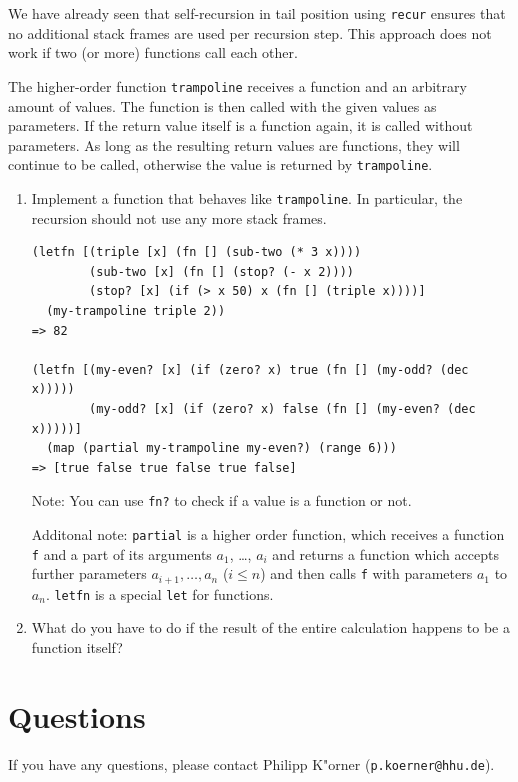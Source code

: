 \documentclass[11pt,a4paper]{article}
\begin{document}
\begin{exercise}
We have already seen that self-recursion in tail position
using \verb|recur| ensures that no additional stack frames are used per recursion step.
This approach does not work if two (or more) functions call each other.

The higher-order function \verb|trampoline| receives a function
and an arbitrary amount of values.
The function is then called with the given values as parameters.
If the return value itself is a function again, it is called without parameters.
As long as the resulting return values are functions, they will continue to be called,
otherwise the value is returned by \verb|trampoline|.

\begin{enumerate}[label=\alph*)]
    \item
    	Implement a function that behaves like \verb|trampoline|.
    	In particular, the recursion should not use any more stack frames.

\begin{verbatim}
(letfn [(triple [x] (fn [] (sub-two (* 3 x))))
        (sub-two [x] (fn [] (stop? (- x 2))))
        (stop? [x] (if (> x 50) x (fn [] (triple x))))]
  (my-trampoline triple 2))
=> 82

(letfn [(my-even? [x] (if (zero? x) true (fn [] (my-odd? (dec x)))))
        (my-odd? [x] (if (zero? x) false (fn [] (my-even? (dec x)))))]
  (map (partial my-trampoline my-even?) (range 6)))
=> [true false true false true false]
\end{verbatim}

Note:
You can use \verb|fn?| to check if a value is a function or not.

Additonal note: \verb|partial| is a higher order function,
which receives a function \verb|f| and a part of its arguments $a_1$, \dots, $a_i$
and returns a function which accepts further parameters $a_{i+1}, \dots, a_n$ ($i \leq n$)
and then calls \verb|f| with parameters $a_1$ to $a_n$.
\verb|letfn| is a special \verb|let| for functions.

\item What do you have to do if the result of the entire calculation happens to be a function itself?
\end{enumerate}

\end{exercise}

\section*{Questions}
If you have any questions, please contact Philipp K"orner (\texttt{p.koerner@hhu.de}).
\end{document}
